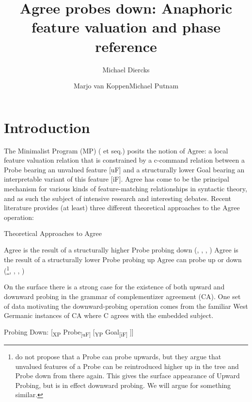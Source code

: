 \documentclass[output=paper
,modfonts
,nonflat
]{langsci/langscibook}
\title{Agree probes down: Anaphoric feature valuation and phase reference}
\author{Michael Diercks\affiliation{Pomona College}\and Marjo van Koppen\affiliation{Utrecht University/Meertens Institute}\lastand Michael Putnam\affiliation{Penn State University}}
\begin{document}
\maketitle


\section{Introduction} \label{Introduction}

The Minimalist Program (MP) (\citealt{Chomsky2000} et seq.) posits the notion of Agree: a local feature valuation relation that is constrained by a c-command relation between a Probe bearing an unvalued feature [uF] and a structurally lower Goal bearing an interpretable variant of this feature [iF]. Agree has come to be the principal mechanism for various kinds of feature-matching relationships in syntactic theory, and as such the subject of intensive research and interesting debates. Recent literature provides (at least) three different theoretical approaches to the Agree operation:

\ea
Theoretical Approaches to Agree \label{TheoryApproaches}
\begin{xlist}
\ex Agree is the result of a structurally higher Probe probing down (\citealt{Chomsky2000}, \citealt{Chomsky:2001}, \citealt{Preminger:2013}, \citealt{Polinsky:2015}) 
\ex Agree is the result of a structurally lower Probe probing up \citep{Zeijlstra:2012, Wurmbrand:2011, Bjorkman:toappearb} 
\ex Agree can probe up or down (\citealt{Bejar:2009}\footnote{\citet{Bejar:2009} do not propose that a Probe can probe upwards, but they argue that unvalued features of a Probe can be reintroduced higher up in the tree and Probe down from there again. This gives the surface appearance of Upward Probing, but is in effect downward probing. We will argue for something similar.}, \citealt{Baker:2008}, \citealt{Putnam:2011}, \citealt{Carstens:2016})
\end{xlist}
\z
\noindent On the surface there is a strong case for the existence of both upward and downward probing in the grammar of complementizer agreement (CA). One set of data motivating the downward-probing operation comes from the familiar West Germanic instances of CA where C agrees with the embedded subject.

\ea \label{ProbeDownSchematic}
Probing Down: [\textsubscript{XP} Probe\textsubscript{[uF]} [\textsubscript{YP} Goal\textsubscript{[iF]} ]]
\z
\end{document}
